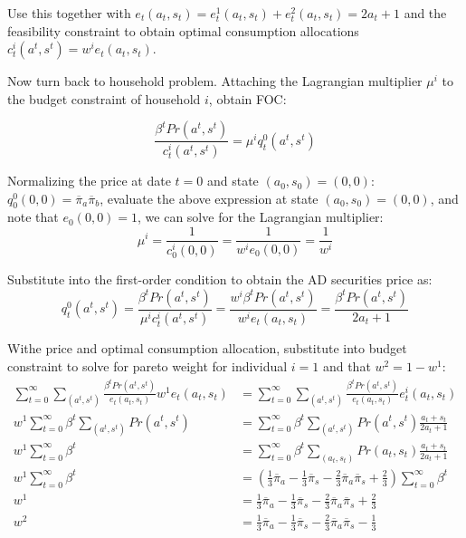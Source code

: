 \documentclass{article}
\begin{document}
\begin{enumerate}[(a)]
Use this together with
$e_t(a_t,s_t)=e_t^1(a_t,s_t)+e_t^2(a_t,s_t) = 2a_t+1$ and the
feasibility constraint to obtain optimal consumption allocations
$c_t^i(a^t,s^t)=w^ie_t(a_t,s_t)$.

Now turn back to household problem. Attaching the Lagrangian
multiplier $\mu^i$ to the budget constraint of household $i$, obtain
FOC:

\begin{equation*}
  \frac{\beta^tPr(a^t,s^t)}{c_t^i(a^t,s^t)}=\mu^iq_t^0(a^t,s^t)
\end{equation*}

Normalizing the price at date $t=0$ and state $(a_0,s_0)=(0,0)$:
$q_0^0(0,0)=\overline{\pi}_a\overline{\pi}_b$, evaluate the above
expression at state $(a_0,s_0)=(0,0)$, and note that $e_0(0,0)=1$, we
can solve for the Lagrangian multiplier:
\begin{equation*}
  \mu^i=\frac{1}{c_0^i(0,0)}=\frac{1}{w^ie_0(0,0)}=\frac{1}{w^i}
\end{equation*}

Substitute into the first-order condition to obtain the AD securities
price as:
\begin{equation*}
  q_t^0(a^t,s^t)=\frac{\beta^tPr(a^t,s^t)}{\mu^ic_t^i(a^t,s^t)}
  =\frac{w^i\beta^tPr(a^t,s^t)}{w^ie_t(a_t,s_t)}
  =\frac{\beta^tPr(a^t,s^t)}{2a_t+1}
\end{equation*}

Withe price and optimal consumption allocation, substitute into budget
constraint to solve for pareto weight for individual $i=1$ and that
$w^2=1-w^1$:
\begin{align*}
  \sum_{t=0}^\infty \sum_{(a^t,s^t)} \frac{\beta^tPr(a^t,s^t)}{e_t(a_t,s_t)}w^1e_t(a_t,s_t) & =
    \sum_{t=0}^\infty \sum_{(a^t,s^t)} \frac{\beta^tPr(a^t,s^t)}{e_t(a_t,s_t)}e_t^i(a_t,s_t)\\
w^1\sum_{t=0}^\infty \beta^t\sum_{(a^t,s^t)} Pr(a^t,s^t) & =
    \sum_{t=0}^\infty \beta^t\sum_{(a^t,s^t)} Pr(a^t,s^t)\frac{a_t+s_t}{2a_t+1}\\
w^1\sum_{t=0}^\infty \beta^t& =
 \sum_{t=0}^\infty \beta^t\sum_{(a_t,s_t)} Pr(a_t,s_t)\frac{a_t+s_t}{2a_t+1}\\
w^1\sum_{t=0}^\infty \beta^t& =
    \left(\frac{1}{3}\overline{\pi}_a-\frac{1}{3}\overline{\pi}_s-\frac{2}{3}\overline{\pi}_a\overline{\pi}_s+\frac{2}{3}\right)\sum_{t=0}^\infty \beta^t\\
  w^1& =\frac{1}{3}\overline{\pi}_a-\frac{1}{3}\overline{\pi}_s-\frac{2}{3}\overline{\pi}_a\overline{\pi}_s+\frac{2}{3}\\
  w^2&=\frac{1}{3}\overline{\pi}_a-\frac{1}{3}\overline{\pi}_s-\frac{2}{3}\overline{\pi}_a\overline{\pi}_s-\frac{1}{3}
\end{align*}


\end{enumerate}
\end{document}

